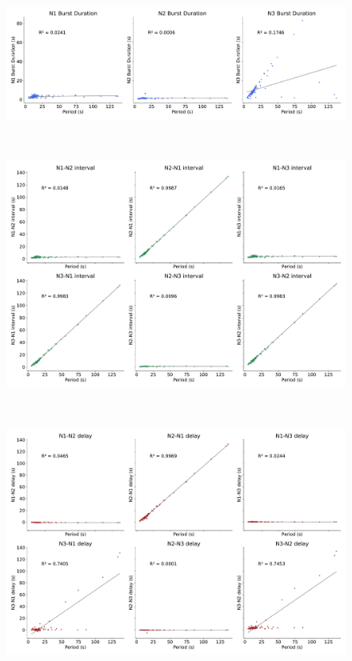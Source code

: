 \begin{figure}[htbp]
\begin{minipage}{0.9\textwidth}
\begin{minipage}[b]{0.53\textwidth}
			\begin{minipage}[b]{\textwidth}
				\centering
				\includegraphics[width=\textwidth]{./invariants/data/SUSSEX/prep2/images/spontaneous_durations.pdf}
			\end{minipage}\\
			\begin{minipage}[b]{\textwidth}
				\centering
				\includegraphics[width=\textwidth]{./invariants/data/SUSSEX/prep2/images/spontaneous_intervals.pdf}
			\end{minipage}\\
			\begin{minipage}[b]{\textwidth}
				\centering
				\includegraphics[width=\textwidth]{./invariants/data/SUSSEX/prep2/images/spontaneous_delays.pdf}

\end{minipage}
\end{minipage}
\end{minipage}
\end{figure}
